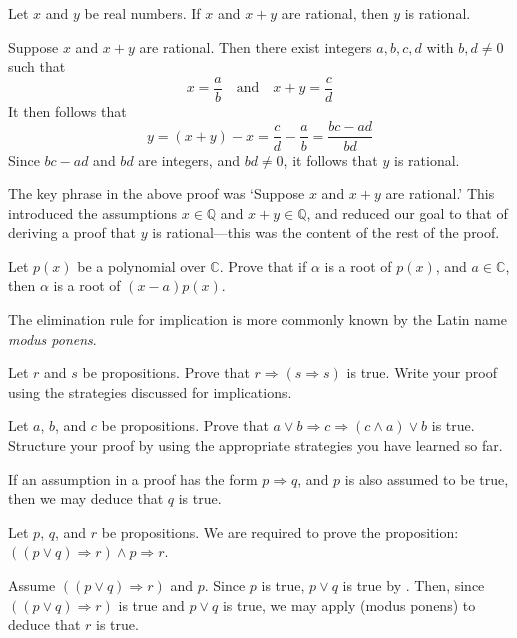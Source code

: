 \begin{proposition}
\label{propRationalTwoOfThree}
Let $x$ and $y$ be real numbers. If $x$ and $x+y$ are rational, then $y$ is rational.
\end{proposition}

\begin{cproof}
Suppose $x$ and $x+y$ are rational. Then there exist integers $a,b,c,d$ with $b,d \ne 0$ such that
\[
x = \frac{a}{b} \quad \text{and} \quad x+y = \frac{c}{d}
\]
It then follows that
\[
y = (x+y)-x = \frac{c}{d}-\frac{a}{b} = \frac{bc-ad}{bd}
\]
Since $bc-ad$ and $bd$ are integers, and $bd \ne 0$, it follows that $y$ is rational.
\end{cproof}

The key phrase in the above proof was `Suppose $x$ and $x+y$ are rational.' This introduced the assumptions $x \in \mathbb{Q}$ and $x+y \in \mathbb{Q}$, and reduced our goal to that of deriving a proof that $y$ is rational---this was the content of the rest of the proof.

\begin{exercise}
Let $p(x)$ be a polynomial over $\mathbb{C}$. Prove that if $\alpha$ is a root of $p(x)$, and $a \in \mathbb{C}$, then $\alpha$ is a root of $(x-a)p(x)$.
\end{exercise}

The elimination rule for implication \elimrule{\Rightarrow} is more commonly known by the Latin name \textit{modus ponens}.

\begin{exercise}
Let $r$ and $s$ be propositions. Prove that $r \Rightarrow (s \Rightarrow s)$ is true. Write your proof using the strategies discussed for implications.
\end{exercise}

\begin{exercise}
Let $a$, $b$, and $c$ be propositions. Prove that $a \vee b \Rightarrow c \Rightarrow (c \wedge a) \vee b$ is true. Structure your proof by using the appropriate strategies you have learned so far.
\end{exercise}

\begin{strategy}
\label{strAssumingImplicationsDirect}
If an assumption in a proof has the form $p \Rightarrow q$, and $p$ is also assumed to be true, then we may deduce that $q$ is true.
\end{strategy}

\begin{example}
Let $p$, $q$, and $r$ be propositions. We are required to prove the proposition: $((p \vee q) \Rightarrow r) \wedge p \Rightarrow r$.

Assume $((p \vee q) \Rightarrow r)$ and $p$. Since $p$ is true, $p \vee q$ is true by . Then, since $((p \vee q) \Rightarrow r)$ is true and $p \vee q$ is true, we may apply  (modus ponens) to deduce that $r$ is true.
\end{example}

